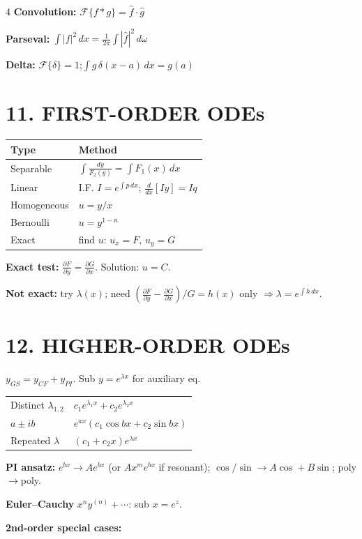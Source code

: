 \documentclass[8pt,a4paper,landscape]{extarticle}
\newcommand{\pf}[2]{\frac{\partial #1}{\partial #2}}
\newcommand{\dx}{\,dx}
\begin{document}
\begin{multicols}{4}
\textbf{Convolution:} $\mathcal{F}\{f*g\}=\hat f\cdot\hat g$

\textbf{Parseval:} $\int|f|^2\dx=\frac{1}{2\pi}\int|\hat f|^2\,d\omega$

\textbf{Delta:} $\mathcal{F}\{\delta\}=1$;\quad $\int g\,\delta(x-a)\dx=g(a)$

\section*{11. FIRST-ORDER ODEs}

\begin{tabular}{@{}p{1.4cm}p{2.6cm}@{}}
\toprule
Type & Method \\
\midrule
Separable & $\int\frac{dy}{F_2(y)}=\int F_1(x)\dx$ \\
Linear & I.F. $I=e^{\int p\dx}$; $\frac{d}{dx}[Iy]=Iq$ \\
Homogeneous & $u=y/x$ \\
Bernoulli & $u=y^{1-n}$ \\
Exact & find $u$: $u_x=F,\,u_y=G$ \\
\bottomrule
\end{tabular}

\textbf{Exact test:} $\pf{F}{y}=\pf{G}{x}$. Solution: $u=C$.

\textbf{Not exact:} try $\lambda(x)$; need $(\pf{F}{y}-\pf{G}{x})/G=h(x)$ only $\Rightarrow\lambda=e^{\int h\dx}$.

\section*{12. HIGHER-ORDER ODEs}

$y_{GS}=y_{CF}+y_{PI}$. Sub $y=e^{\lambda x}$ for auxiliary eq.

\begin{tabular}{@{}ll@{}}
Distinct $\lambda_{1,2}$ & $c_1e^{\lambda_1 x}+c_2e^{\lambda_2 x}$ \\
$a\pm ib$ & $e^{ax}(c_1\cos bx+c_2\sin bx)$ \\
Repeated $\lambda$ & $(c_1+c_2x)e^{\lambda x}$ \\
\end{tabular}

\textbf{PI ansatz:} $e^{bx}\to Ae^{bx}$ (or $Ax^me^{bx}$ if resonant); $\cos/\sin\to A\cos+B\sin$; poly$\to$poly.

\textbf{Euler--Cauchy} $x^ny^{(n)}+\cdots$: sub $x=e^z$.

\textbf{2nd-order special cases:}


\end{multicols}
\end{document}
